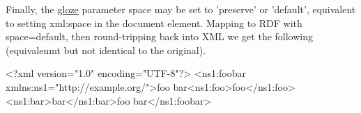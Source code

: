 Finally, the \hyperlink{namespacecom_1_1hp_1_1gloze}{gloze} parameter space may be set to 'preserve' or 'default', equivalent to setting xml:space in the document element. Mapping to RDF with space=default, then round-\/tripping back into XML we get the following (equivalenmt but not identical to the original).


\begin{DoxyCodeInclude}
<?xml version="1.0" encoding="UTF-8"?>
<ns1:foobar xmlns:ns1="http://example.org/">foo bar<ns1:foo>foo</ns1:foo>
    <ns1:bar>bar</ns1:bar>foo bar</ns1:foobar>
\end{DoxyCodeInclude}
 